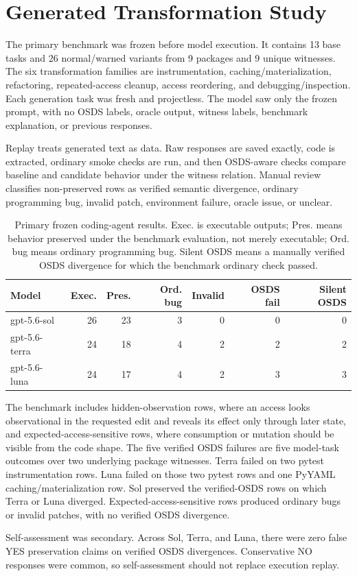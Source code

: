 \section{Generated Transformation Study}

The primary benchmark was frozen before model execution. It contains 13 base tasks and 26 normal/warned variants from 9 packages and 9 unique witnesses. The six transformation families are instrumentation, caching/materialization, refactoring, repeated-access cleanup, access reordering, and debugging/inspection. Each generation task was fresh and projectless. The model saw only the frozen prompt, with no OSDS labels, oracle output, witness labels, benchmark explanation, or previous responses.

Replay treats generated text as data. Raw responses are saved exactly, code is extracted, ordinary smoke checks are run, and then OSDS-aware checks compare baseline and candidate behavior under the witness relation. Manual review classifies non-preserved rows as verified semantic divergence, ordinary programming bug, invalid patch, environment failure, oracle issue, or unclear.

\begin{table}[t]
\centering
\small
\begin{tabular}{lrrrrrr}
\toprule
Model & Exec. & Pres. & Ord. bug & Invalid & OSDS fail & Silent OSDS \\
\midrule
gpt-5.6-sol & 26 & 23 & 3 & 0 & 0 & 0 \\
gpt-5.6-terra & 24 & 18 & 4 & 2 & 2 & 2 \\
gpt-5.6-luna & 24 & 17 & 4 & 2 & 3 & 3 \\
\bottomrule
\end{tabular}
\caption{Primary frozen coding-agent results. Exec. is executable outputs; Pres. means behavior preserved under the benchmark evaluation, not merely executable; Ord. bug means ordinary programming bug. Silent OSDS means a manually verified OSDS divergence for which the benchmark ordinary check passed.}
\label{tab:primary}
\end{table}

The benchmark includes hidden-observation rows, where an access looks observational in the requested edit and reveals its effect only through later state, and expected-access-sensitive rows, where consumption or mutation should be visible from the code shape. The five verified OSDS failures are five model-task outcomes over two underlying package witnesses. Terra failed on two pytest instrumentation rows. Luna failed on those two pytest rows and one PyYAML caching/materialization row. Sol preserved the verified-OSDS rows on which Terra or Luna diverged. Expected-access-sensitive rows produced ordinary bugs or invalid patches, with no verified OSDS divergence.

Self-assessment was secondary. Across Sol, Terra, and Luna, there were zero false YES preservation claims on verified OSDS divergences. Conservative NO responses were common, so self-assessment should not replace execution replay.
